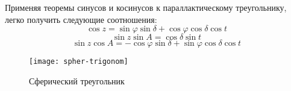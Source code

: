 Применяя теоремы синусов и косинусов к параллактическому треугольнику, легко получить следующие соотношения:
\begin{equation}
\cos z=\sin\varphi\sin\delta+\cos\varphi\cos\delta\cos t
\end{equation}
\begin{equation}
\sin z\sin A=\cos\delta\sin t
\end{equation}
\begin{equation}
\sin z\cos A=-\cos\varphi\sin\delta+\sin\varphi\cos\delta\cos t
\end{equation}

\begin{figure}[!h]
\centering
 \texttt{[image: spher-trigonom]}
 \caption{Сферический треугольник}
\end{figure}




